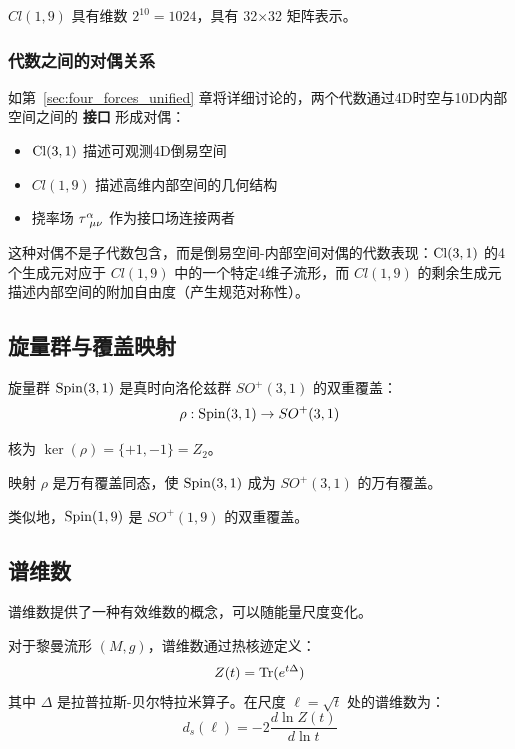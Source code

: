 $Cl(1,9)$ 具有维数 $2^{10} = 1024$，具有 32×32 矩阵表示。

\subsubsection{代数之间的对偶关系}

\begin{insight}[$\Cl(3,1)$ 与 $Cl(1,9)$ 之间的接口]
如第~\ref{sec:four_forces_unified} 章将详细讨论的，两个代数通过4D时空与10D内部空间之间的 \textbf{接口} 形成对偶：
\begin{itemize}
    \item $\Cl(3,1)$ 描述可观测4D倒易空间
    \item $Cl(1,9)$ 描述高维内部空间的几何结构
    \item 挠率场 $\torsion^\alpha_{\ \mu\nu}$ 作为接口场连接两者
\end{itemize}
这种对偶不是子代数包含，而是倒易空间-内部空间对偶的代数表现：$\Cl(3,1)$ 的4个生成元对应于 $Cl(1,9)$ 中的一个特定4维子流形，而 $Cl(1,9)$ 的剩余生成元描述内部空间的附加自由度（产生规范对称性）。
\end{insight}

\subsection{旋量群与覆盖映射}

旋量群 $\mathrm{Spin}(3,1)$ 是真时向洛伦兹群 $SO^+(3,1)$ 的双重覆盖：
\begin{equation}
    \rho: \mathrm{Spin}(3,1) \to SO^+(3,1)
\end{equation}

核为 $\ker(\rho) = \{+1, -1\} = Z_2$。

\begin{theorem}[万有覆盖]
映射 $\rho$ 是万有覆盖同态，使 $\mathrm{Spin}(3,1)$ 成为 $SO^+(3,1)$ 的万有覆盖。
\end{theorem}

类似地，$\mathrm{Spin}(1,9)$ 是 $SO^+(1,9)$ 的双重覆盖。

\subsection{谱维数}

谱维数提供了一种有效维数的概念，可以随能量尺度变化。

\begin{definition}[谱维数]
对于黎曼流形 $(M, g)$，谱维数通过热核迹定义：
\begin{equation}
    Z(t) = \mathrm{Tr}(e^{t\Delta})
\end{equation}
其中 $\Delta$ 是拉普拉斯-贝尔特拉米算子。在尺度 $\ell = \sqrt{t}$ 处的谱维数为：
\begin{equation}
    d_s(\ell) = -2 \frac{d \ln Z(t)}{d \ln t}
\end{equation}
\end{definition}

